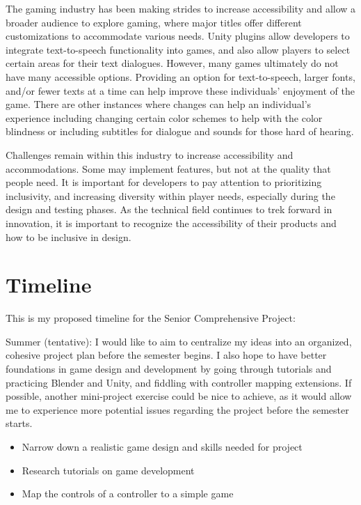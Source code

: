 \documentclass[10pt,twocolumn]{article}
\begin{document}
The gaming industry has been making strides to increase accessibility and allow a broader audience to explore gaming, where major titles offer different customizations to accommodate various needs. Unity plugins allow developers to integrate text-to-speech functionality into games, and also allow players to select certain areas for their text dialogues. However, many games ultimately do not have many accessible options. Providing an option for text-to-speech, larger fonts, and/or fewer texts at a time can help improve these individuals' enjoyment of the game. There are other instances where changes can help an individual's experience including changing certain color schemes to help with the color blindness or including subtitles for dialogue and sounds for those hard of hearing.\cite{Hassan_2024} 

Challenges remain within this industry to increase accessibility and accommodations. Some may implement features, but not at the quality that people need. It is important for developers to pay attention to prioritizing inclusivity, and increasing diversity within player needs, especially during the design and testing phases. As the technical field continues to trek forward in innovation, it is important to recognize the accessibility of their products and how to be inclusive in design.

\section{Timeline}
This is my proposed timeline for the Senior Comprehensive Project:

Summer (tentative):
I would like to aim to centralize my ideas into an organized, cohesive project plan before the semester begins. I also hope to have better foundations in game design and development by going through tutorials and practicing Blender and Unity, and fiddling with controller mapping extensions. If possible, another mini-project exercise could be nice to achieve, as it would allow me to experience more potential issues regarding the project  before the semester starts.
\begin{itemize}
\item Narrow down a realistic game design and skills needed for project
\item Research tutorials on game development
\item Map the controls of a controller to a simple game
\end{itemize}
\end{document}
